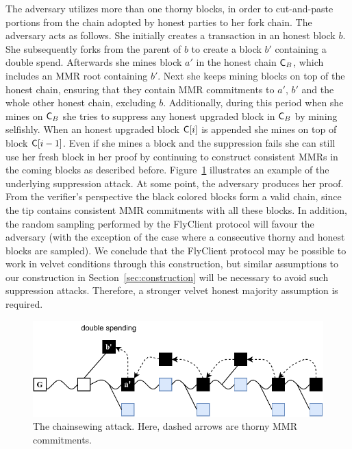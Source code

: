 	The adversary utilizes more than one thorny blocks, in order to cut-and-paste portions from the chain adopted by honest parties to her fork chain.
    The adversary acts as follows.
		She initially creates a transaction in an honest block $b$. She subsequently forks from the parent of $b$ to create a block $b'$ containing
		a double spend.
    Afterwards she mines block $a'$ in the honest chain $\mathsf{C}_B$, which includes an MMR root containing $b'$.
    Next she keeps mining blocks on top of the honest chain, ensuring that they contain MMR commitments to
		$a'$, $b'$ and the whole other honest chain, excluding $b$.
    Additionally, during this period when she mines on $\mathsf{C}_B$ she tries to suppress any honest upgraded block in $\mathsf{C}_B$ by mining selfishly.
    When an honest upgraded block $\mathsf{C}[i]$ is appended she mines on top of block $\mathsf{C}[i-1]$.
    Even if she mines a block and the suppression fails she can still use her fresh block in her proof by continuing to construct consistent MMRs
    in the coming blocks as described before.
		Figure~\ref{fig:combined_chainsewing_flyclient} illustrates an example of the underlying suppression attack.
    At some point, the adversary produces her proof.
    From the verifier's perspective the black colored blocks form a valid chain,
    since the tip contains consistent MMR commitments with all these blocks.
    In addition, the random sampling performed by the FlyClient protocol will favour the adversary
		(with the exception of the case where a consecutive thorny and honest blocks are sampled).
		We conclude that the FlyClient protocol may be possible to work in velvet conditions through this construction,
		but similar assumptions to our construction in Section~\ref{sec:construction} will be necessary to avoid such suppression attacks.
		Therefore, a stronger velvet honest majority assumption is required.

	\begin{figure}
		\begin{center}
			\includegraphics[width=0.95\columnwidth]{figures/flyclient_combined_attack.pdf}
		\end{center}
		\caption{The chainsewing attack. Here, dashed arrows are thorny MMR commitments.}
		\label{fig:combined_chainsewing_flyclient}
	\end{figure}

